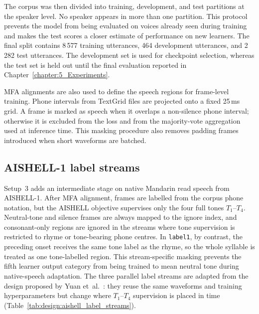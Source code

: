 The corpus was then divided into training, development, and test partitions at
the speaker level. No speaker appears in more than one partition. This protocol
prevents the model from being evaluated on voices already seen during training
and makes the test scores a closer estimate of performance on new learners. The
final split contains 8\,577 training utterances, 464 development utterances, and
2\,282 test utterances. The development set is used for checkpoint selection,
whereas the test set is held out until the final evaluation reported in
Chapter~\ref{chapter:5_Experiments}.

MFA alignments are also used to define the speech regions for frame-level
training. Phone intervals from TextGrid files are projected onto a fixed 25\,ms
grid. A frame is marked as speech when it overlaps a non-silence phone interval;
otherwise it is excluded from the loss and from the majority-vote aggregation
used at inference time. This masking procedure also removes padding frames
introduced when short waveforms are batched.

\subsection{AISHELL-1 label streams}
\label{sec:design:pipeline:aishell}

Setup~3 adds an intermediate stage on native Mandarin read speech from
AISHELL-1. After MFA alignment, frames are labelled from the corpus phone
notation, but the AISHELL objective supervises only the four full tones
\(T_1\)--\(T_4\). Neutral-tone and silence frames are always mapped to the ignore
index, and consonant-only regions are ignored in the streams where tone
supervision is restricted to rhyme or tone-bearing phone centres. In
\texttt{label1}, by contrast, the preceding onset receives the same tone label as
the rhyme, so the whole syllable is treated as one tone-labelled region. This
stream-specific masking prevents the fifth learner output category from being
trained to mean neutral tone during native-speech adaptation. The three parallel
label streams are adapted from the design proposed by Yuan et~al.~\cite{yuan2023}:
they reuse the same waveforms and training hyperparameters but change where
\(T_1\)--\(T_4\) supervision is placed in time
(Table~\ref{tab:design:aishell_label_streams}).

